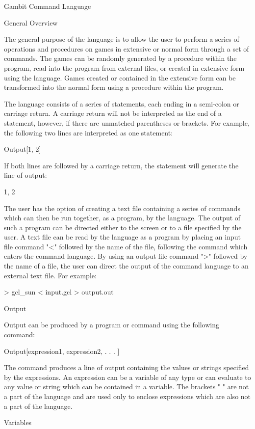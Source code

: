 Gambit Command Language


General Overview

The general purpose of the language is to allow the user to perform a series of
operations and procedures on games in extensive or normal form through a set of
commands.  The games can be randomly generated by a procedure within the
program, read into the program from external files, or created in extensive
form using the language.  Games created or contained in the extensive form can
be transformed into the normal form using a procedure within the program.

The language consists of a series of statements, each ending in a semi-colon
or carriage return.  A carriage return will not be interpreted as the end of a
statement, however, if there are unmatched parentheses or brackets.  For
example, the following two lines are interpreted as one statement:

	Output[1,
	2]

If both lines are followed by a carriage return, the statement will generate
the line of output: 

	1, 2

The user has the option of creating a text file containing a series of commands
which can then be run together, as a program, by the language.  The output of 
such a program can be directed either to the screen or to a file specified by 
the user.  A text file can be read by the language as a program by placing an 
input file command "<" followed by the name of the file, following the command 
which enters the command language.  By using an output file command ">" 
followed by the name of a file, the user can direct the output of the command
language to an external text file.  For example:

	> gcl_sun < input.gcl > output.out


Output

Output can be produced by a program or command using the following command:

	Output[{expression1}, {expression2}, . . . ]

The command produces a line of output containing the values or strings 
specified by the expressions.  An expression can be a variable of any type or 
can evaluate to any value or string which can be contained in a variable.  The 
brackets "{ }" are not a part of the language and are used only to enclose
expressions which are also not a part of the language.


Variables

